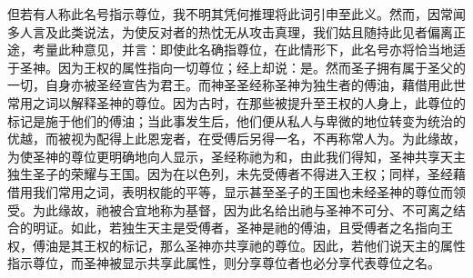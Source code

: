 但若有人称此名号指示尊位，我不明其凭何推理将此词引申至此义。然而，因常闻多人言及此类说法，为使反对者的热忱无从攻击真理，我们姑且随持此见者偏离正途，考量此种意见，并言：即使此名确指尊位，在此情形下，此名号亦将恰当地适于圣神。因为王权的属性指向一切尊位；经上却说：是。然而圣子拥有属于圣父的一切，自身亦被圣经宣告为君王。而神圣圣经称圣神为独生者的傅油，藉借用此世常用之词以解释圣神的尊位。因为古时，在那些被提升至王权的人身上，此尊位的标记是施于他们的傅油；当此事发生后，他们便从私人与卑微的地位转变为统治的优越，而被视为配得上此恩宠者，在受傅后另得一名，不再称常人为。为此缘故，为使圣神的尊位更明确地向人显示，圣经称祂为和，由此我们得知，圣神共享天主独生圣子的荣耀与王国。因为在以色列，未先受傅者不得进入王权；同样，圣经藉借用我们常用之词，表明权能的平等，显示甚至圣子的王国也未经圣神的尊位而领受。为此缘故，祂被合宜地称为基督，因为此名给出祂与圣神不可分、不可离之结合的明证。如此，若独生天主是受傅者，圣神是祂的傅油，且受傅者之名指向王权，傅油是其王权的标记，那么圣神亦共享祂的尊位。因此，若他们说天主的属性指示尊位，而圣神被显示共享此属性，则分享尊位者也必分享代表尊位之名。\par

